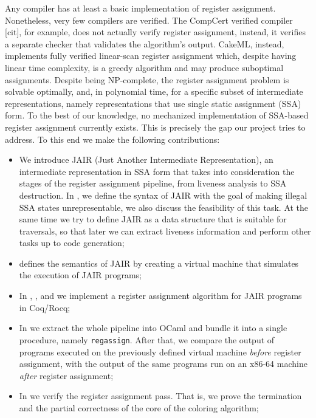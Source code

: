 Any compiler has at least a basic implementation of register assignment. Nonetheless, very few compilers are verified. The CompCert verified compiler [cit], for example, does not actually verify register assignment, instead, it verifies a separate checker that validates the algorithm's output. CakeML, instead, implements fully verified linear-scan register assignment which, despite having linear time complexity, is a greedy algorithm and may produce suboptimal assignments.
Despite being NP-complete, the register assignment problem is solvable optimally, and, in polynomial time, for a specific subset of intermediate representations, namely representations that use single static assignment (SSA) form.
To the best of our knowledge, no mechanized implementation of SSA-based register assignment currently exists. This is precisely the gap our project tries to address. To this end we make the following contributions:

\begin{itemize}
    \item We introduce JAIR (Just Another Intermediate Representation), an intermediate representation in SSA form that takes into consideration the stages of the register assignment pipeline, from liveness analysis to SSA destruction. In , we define the syntax of JAIR with the goal of making illegal SSA states unrepresentable, we also discuss the feasibility of this task. At the same time we try to define JAIR as a data structure that is suitable for traversals, so that later we can extract liveness information and perform other tasks up to code generation;

    \item {} defines the semantics of JAIR by creating a virtual machine that simulates the execution of JAIR programs;

    \item In , , and  we implement a register assignment algorithm for JAIR programs in Coq/Rocq;

    \item In  we extract the whole pipeline into OCaml and bundle it into a single procedure, namely \texttt{regassign}. After that, we compare the output of programs executed on the previously defined virtual machine \textit{before} register assignment, with the output of the same programs run on an x86-64 machine \textit{after} register assignment;

    \item In  we verify the register assignment pass. That is, we prove the termination and the {\color{red} partial correctness} of the core of the coloring algorithm;
\end{itemize}

